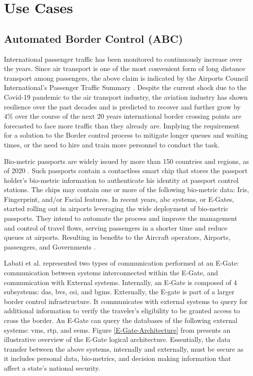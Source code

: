 \chapter{Use Cases}
\label{ch:usecases}

\section{Automated Border Control (ABC)}
International passenger traffic has been monitored to continuously increase over the years. Since air transport is one of the most convenient form of long distance transport among passengers, the above claim is indicated by the Airports Council International's Passenger Traffic Summary . Despite the current shock due to the Covid-19 pandemic to the air transport industry, the aviation industry has shown resilience over the past decades and is predicted to recover and further grow by $ 4\% $ over the course of the next 20 years  international border crossing points are forecasted to face more traffic than they already are. Implying the requirement for a solution to the Border control process to mitigate longer queues and waiting times, or the need to hire and train more personnel to conduct the task.
\par
Bio-metric passports are widely issued by more than 150 countries and regions, as of 2020 . Such passports contain a contactless smart chip that stores the passport holder's bio-metric information to authenticate his identity at passport control stations. The chips may contain one or more of the following bio-metric data: Iris, Fingerprint, and/or Facial features. In recent years, \gls{abc} systems, or E-Gates, started rolling out in airports leveraging the wide deployment of bio-metric passports. They intend to automate the process and improve the management and control of travel flows, serving passengers in a shorter time and reduce queues at airports. Resulting in benefits to the Aircraft operators, Airports, passengers, and Governments \cite{Angiolelli-meyer2015}.
\par
Labati et al. \cite{labati2016biometric} represented two types of communication performed at an E-Gate: communication between systems interconnected within the E-Gate, and communication with External systems. Internally, an E-Gate is composed of 4 subsystems: \gls{das}, \gls{bvs}, \gls{csi}, and \gls{bgms}. Externally, the E-gate is part of a larger border control infrastructure. It communicates with external systems to query for additional information to verify the traveler's eligibility to be granted access to cross the border. An E-Gate can query the databases of the following external systems: \gls{vms}, \gls{rtp}, and \gls{eems}. Figure \ref{E-Gate-Architecture} from \cite{labati2016biometric} presents an illustrative overview of the E-Gate logical architecture. Essentially, the data transfer between the above systems, internally and externally, must be secure as it includes personal data, bio-metrics, and decision making information that affect a state's national security.
